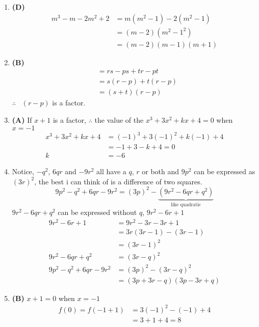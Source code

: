 \begin{multicols}{2}
\begin{enumerate}[label={\textbf{\arabic*.}}]
\item \textbf{(D)}
\begin{align*}
m^3 - m -2m^2 + 2 &= m(m^2 -1) -2 (m^2 -1) \\
& = (m - 2)(m^2 - 1^2) \\
& = (m-2)(m-1)(m+1)
\end{align*}

\item \textbf{(B)}
\begin{align*}
& = rs -ps + tr - pt \\
& = s(r-p) + t(r-p) \\
& = (s + t)(r-p)
\end{align*}
$\therefore \hspace{10pt} (r-p) $ is a factor.

\item \textbf{(A)} If $x + 1$ is a factor, $\therefore$ the value of the $x^3 + 3x^2 + kx + 4 = 0$ when $x = -1$ \\
\begin{align*}
x^3 + 3x^2 + kx + 4 &= (-1)^3 + 3(-1)^2 +k(-1) + 4 \\
& = -1 + 3 -k + 4 = 0 \\
k & = -6
\end{align*}

\item Notice, \(-q^2\), \(6qr\) and \(-9r^2\) all have a \(q\), \(r\) or both and \(9p^2\) can be expressed as $(3r)^2$, the best i can think of is a difference of two squares. \\
$$9p^2 - q^2 + 6qr - 9r^2 = (3p)^2 - \underbrace{(9r^2 - 6qr + q^2)}_{\text{like quadratic} }$$
$9r^2 - 6qr + q^2$ can be expressed without $q$,  $9r^2 - 6r + 1$
\begin{align*}
9r^2 - 6r + 1 &= 9r^2 - 3r - 3r + 1 \\
&= 3r(3r -1) -(3r -1) \\
&= (3r -1)^2 \\
9r^2 - 6qr + q^2  &= (3r -q)^2 \\
9p^2 - q^2 + 6qr - 9r^2 &= (3p)^2 - (3r -q)^2 \\
&= (3p + 3r - q)(3p - 3r + q)
\end{align*}

\item \textbf{(B)} $x+1 = 0$ when $x = -1$
\begin{align*}
f(0) = f(-1 + 1) &= 3(-1)^2 - (-1) + 4 \\
& = 3 + 1 + 4 = 8
\end{align*}


\end{enumerate}
\end{multicols}
